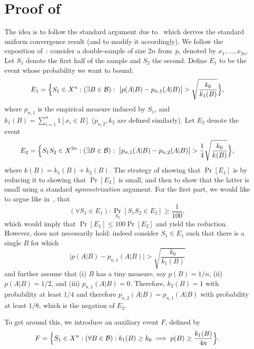\documentclass{article}
\newcommand{\B}{{\cal B}}
\begin{document}
\section{Proof of }

The idea is to follow the standard argument due to~\cite{vapnik} 
which derives the standard uniform convergence result (and to modify it accordingly). 
We follow the exposition of~\cite{anthony}:
consider a double-sample of size $2n$ from~$p$, denoted by $x_1,\ldots,x_{2n}$.
Let $S_1$ denote the first half of the sample and $S_2$ the second.
Define $E_1$ to be the event whose probability we want to bound:
\[E_1 = \Bigl\{ S_1\in X^n : (\exists B\in \B):~ 
\bigl\lvert p(A \vert B) - p_{n,1}(A \vert B) \bigr\rvert > 
\sqrt{\frac{k_0}{k_{1}(B)}} \Bigr\},\]
where $p_{n,1}$ is the empirical measure induced by $S_1$, 
and $k_{1}(B)=\sum_{i=1}^n 1[x_i\in B]$ ($p_{n,2}, k_{2}$ are defined similarly).
Let $E_2$ denote the event
\[E_2 = 
\Bigl\{
S_1S_2\in X^{2n} : (\exists B\in\B):~
\bigl\lvert p_{n,1}(A \vert B)   -  p_{n,2}(A \vert B) \bigr\rvert >  
\frac{1}{4}\sqrt{\frac{k_0}{k(B)}}
\Bigr\},
\]
where $k(B) = k_{1}(B)+k_{2}(B)$.
The strategy of showing that $\Pr[E_1]$ is by reducing it to showing that $\Pr[E_2]$ 
is small, and then to show that the latter is small using a standard \emph{symmetrization} argument. 
For the first part, we would like to argue like in~\cite{anthony}, that
\begin{equation}\label{eq:anthony} 
(\forall S_1\in E_1): \Pr_{S_2}[S_1S_2\in E_2]\geq \frac{1}{100},
\end{equation}
which would imply that $\Pr[E_1]\leq 100\Pr[E_2]$ and yield the reduction.
However,  does not necessarily hold: indeed consider
$S_1\in E_1$ such that there is a single $B$ for which 
\[
\bigl\lvert p(A \vert B) - p_{n,1}(A \vert B) \bigr\rvert > 
\sqrt{\frac{k_0}{k_{1}(B)}}
\]
and further assume that 
(i) $B$ has a tiny measure, say $p(B) = 1/n$,
(ii) $p(A\vert B)= 1/2$, and
(iii) $p_{n,1}(A\vert B) = 0$.
Therefore, $k_2(B)=1$ with probability at least $1/4$
and therefore $p_{n,2}(A \vert B)=p_{n,1}(A \vert B)$
with probability at least $1/8$, which is the negation of $E_2$.

To get around this, we introduce an auxiliary event $F$, defined by
\[F = \Bigl\{S_1\in X^{n} : (\forall B\in\B): k_{1}(B) \geq k_0 \implies p(B)\geq \frac{k_{1}(B)}{4n}\Bigr\}. \]
\end{document}
